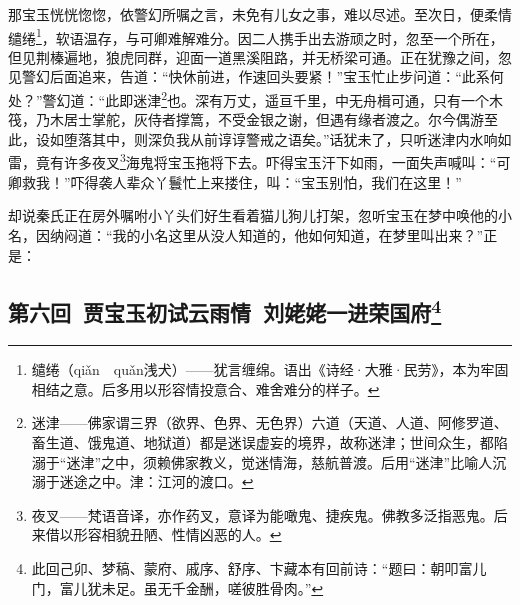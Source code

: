 \par 那宝玉恍恍惚惚，依警幻所嘱之言，未免有儿女之事，难以尽述。至次日，便柔情缱绻\footnote{缱绻（qiǎn　quǎn浅犬）——犹言缠绵。语出《诗经·大雅·民劳》，本为牢固相结之意。后多用以形容情投意合、难舍难分的样子。}，软语温存，与可卿难解难分。因二人携手出去游顽之时，忽至一个所在，但见荆榛遍地，狼虎同群，迎面一道黑溪阻路，并无桥梁可通。正在犹豫之间，忽见警幻后面追来，告道：“快休前进，作速回头要紧！”宝玉忙止步问道：“此系何处？”警幻道：“此即迷津\footnote{迷津——佛家谓三界（欲界、色界、无色界）六道（天道、人道、阿修罗道、畜生道、饿鬼道、地狱道）都是迷误虚妄的境界，故称迷津；世间众生，都陷溺于“迷津”之中，须赖佛家教义，觉迷情海，慈航普渡。后用“迷津”比喻人沉溺于迷途之中。津：江河的渡口。}也。深有万丈，遥亘千里，中无舟楫可通，只有一个木筏，乃木居士掌舵，灰侍者撑篙，不受金银之谢，但遇有缘者渡之。尔今偶游至此，设如堕落其中，则深负我从前谆谆警戒之语矣。”话犹未了，只听迷津内水响如雷，竟有许多夜叉\footnote{夜叉——梵语音译，亦作药叉，意译为能噉鬼、捷疾鬼。佛教多泛指恶鬼。后来借以形容相貌丑陋、性情凶恶的人。}海鬼将宝玉拖将下去。吓得宝玉汗下如雨，一面失声喊叫：“可卿救我！”吓得袭人辈众丫鬟忙上来搂住，叫：“宝玉别怕，我们在这里！”
\par 却说秦氏正在房外嘱咐小丫头们好生看着猫儿狗儿打架，忽听宝玉在梦中唤他的小名，因纳闷道：“我的小名这里从没人知道的，他如何知道，在梦里叫出来？”正是：



\clearpage
\subsection*{第六回\ 贾宝玉初试云雨情\ 刘姥姥一进荣国府\footnote{此回己卯、梦稿、蒙府、戚序、舒序、卞藏本有回前诗：“题曰：朝叩富儿门，富儿犹未足。虽无千金酬，嗟彼胜骨肉。”}}

